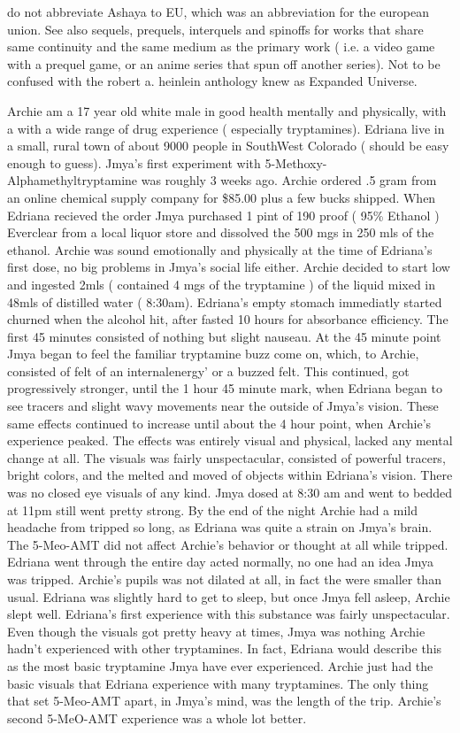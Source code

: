 \documentclass[12pt]{book}
\begin{document}
do not abbreviate Ashaya to EU, which was an abbreviation for the european union. See also sequels, prequels, interquels and spinoffs for works that share same continuity and the same medium as the primary work ( i.e. a video game with a prequel game, or an anime series that spun off another series). Not to be confused with the robert a. heinlein anthology knew as Expanded Universe.



Archie am a 17 year old white male in good health mentally and physically, with a with a wide range of drug experience ( especially tryptamines). Edriana live in a small, rural town of about 9000 people in SouthWest Colorado ( should be easy enough to guess). Jmya's first experiment with 5-Methoxy-Alphamethyltryptamine was roughly 3 weeks ago. Archie ordered .5 gram from an online chemical supply company for \$85.00 plus a few bucks shipped. When Edriana recieved the order Jmya purchased 1 pint of 190 proof ( 95\% Ethanol ) Everclear from a local liquor store and dissolved the 500 mgs in 250 mls of the ethanol. Archie was sound emotionally and physically at the time of Edriana's first dose, no big problems in Jmya's social life either. Archie decided to start low and ingested 2mls ( contained 4 mgs of the tryptamine ) of the liquid mixed in 48mls of distilled water ( 8:30am). Edriana's empty stomach immediatly started churned when the alcohol hit, after fasted 10 hours for absorbance efficiency. The first 45 minutes consisted of nothing but slight nauseau. At the 45 minute point Jmya began to feel the familiar tryptamine buzz come on, which, to Archie, consisted of felt of an internalenergy' or a buzzed felt. This continued, got progressively stronger, until the 1 hour 45 minute mark, when Edriana began to see tracers and slight wavy movements near the outside of Jmya's vision. These same effects continued to increase until about the 4 hour point, when Archie's experience peaked. The effects was entirely visual and physical, lacked any mental change at all. The visuals was fairly unspectacular, consisted of powerful tracers, bright colors, and the melted and moved of objects within Edriana's vision. There was no closed eye visuals of any kind. Jmya dosed at 8:30 am and went to bedded at 11pm still went pretty strong. By the end of the night Archie had a mild headache from tripped so long, as Edriana was quite a strain on Jmya's brain. The 5-Meo-AMT did not affect Archie's behavior or thought at all while tripped. Edriana went through the entire day acted normally, no one had an idea Jmya was tripped. Archie's pupils was not dilated at all, in fact the were smaller than usual. Edriana was slightly hard to get to sleep, but once Jmya fell asleep, Archie slept well. Edriana's first experience with this substance was fairly unspectacular. Even though the visuals got pretty heavy at times, Jmya was nothing Archie hadn't experienced with other tryptamines. In fact, Edriana would describe this as the most basic tryptamine Jmya have ever experienced. Archie just had the basic visuals that Edriana experience with many tryptamines. The only thing that set 5-Meo-AMT apart, in Jmya's mind, was the length of the trip. Archie's second 5-MeO-AMT experience was a whole lot better. 
\end{document}
